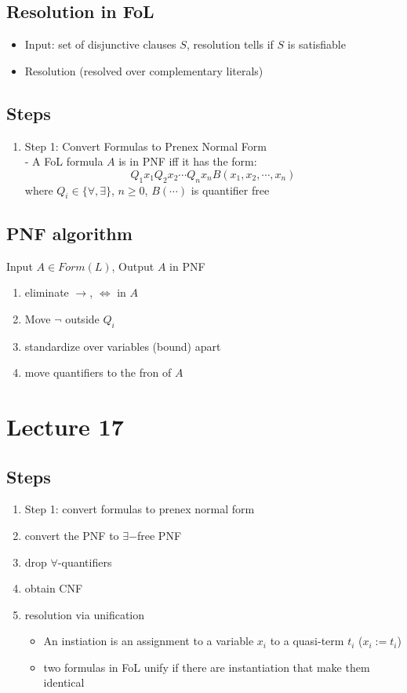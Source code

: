 \documentclass[11pt]{article}
\begin{document}
\subsection{Resolution in FoL}
\begin{itemize}
    \item Input: set of disjunctive clauses $S$, resolution tells if $S$ is satisfiable
    \item Resolution (resolved over complementary literals)
\end{itemize}
\subsection*{Steps}
\begin{enumerate}
    \item Step 1: Convert Formulas to Prenex Normal Form \\
    - A FoL formula $A$ is in PNF iff it has the form:
    \[Q_1x_1Q_2x_2\cdots Q_nx_n B(x_1,x_2,\cdots,x_n)\]
    where $Q_i\in\{\forall, \exists\}$, $n\geq 0$, $B(\cdots)$ is quantifier free 
\end{enumerate}
\subsection{PNF algorithm}
Input $A\in Form(L)$, Output $A$ in PNF
\begin{enumerate}
    \item eliminate $\rightarrow$, $\iff$ in $A$
    \item Move $\neg$ outside $Q_i$
    \item standardize over variables (bound) apart 
    \item move quantifiers to the fron of $A$
\end{enumerate}

\section{Lecture 17}
\subsection{Steps}
\begin{enumerate}
    \item Step 1: convert formulas to prenex normal form 
    \item convert the PNF to $\exists-$free PNF 
    \item drop $\forall$-quantifiers 
    \item obtain CNF 
    \item resolution via unification 
    \begin{itemize}
        \item An instiation is an assignment to a variable $x_i$ to a quasi-term $t_i$ ($x_i:=t_i$)
        \item two formulas in FoL unify if there are instantiation that make them identical 
    \end{itemize}
\end{enumerate}
\end{document}

